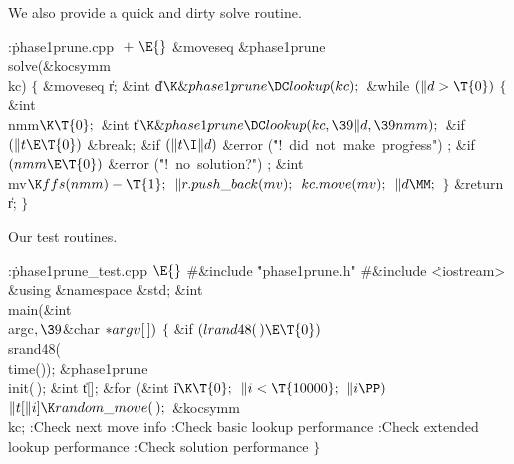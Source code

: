 We also provide a quick and dirty solve routine.

\Y\B\4:\.{phase1prune.cpp }\X${}\mathrel+\E{}$\6
\&{moveseq} \&{phase1prune}\DC\\{solve}(\&{kocsymm} \\{kc})\1\1\2\2\6
${}\{{}$\1\6
\&{moveseq} \|r;\6
\&{int} \|d${}\K\&{phase1prune}\DC\\{lookup}(\\{kc});{}$\7
\&{while} ${}(\|d>\T{0}){}$\5
${}\{{}$\1\6
\&{int} \\{nmm}${}\K\T{0};{}$\6
\&{int} \|t${}\K\&{phase1prune}\DC\\{lookup}(\\{kc},\39\|d,\39\\{nmm});{}$\7
\&{if} ${}(\|t\E\T{0}){}$\1\5
\&{break};\2\6
\&{if} ${}(\|t\I\|d){}$\1\6
\&{error} (\.{"!\ did\ not\ make\ prog}\)\.{ress"})\1\5
;\2\2\6
\&{if} ${}(\\{nmm}\E\T{0}){}$\1\6
\&{error} (\.{"!\ no\ solution?"})\1\5
;\2\2\7
\&{int} \\{mv}${}\K\\{ffs}(\\{nmm})-\T{1};{}$\7
${}\|r.\\{push\_back}(\\{mv});{}$\6
${}\\{kc}.\\{move}(\\{mv});{}$\6
${}\|d\MM;{}$\6
\4${}\}{}$\2\6
\&{return} \|r;\6
\4${}\}{}$\2\par
\fi

Our test routines.

\Y\B\4:\.{phase1prune\_test.cpp }\X${}\E{}$\6
\8\#\&{include} \.{"phase1prune.h"}\6
\8\#\&{include} \.{<iostream>}\6
\&{using} \&{namespace} \&{std};\7
\&{int} \\{main}(\&{int} \\{argc}${},\39{}$\&{char} ${}{*}\\{argv}[\,]){}$\1\1%
\2\2\6
${}\{{}$\1\6
\&{if} ${}(\\{lrand48}(\,)\E\T{0}){}$\1\5
\\{srand48}(\\{time}());\2\6
\&{phase1prune}\DC\\{init}(\,);\7
\&{int} \|t[];\7
\&{for} (\&{int} \|i${}\K\T{0};{}$ ${}\|i<\T{10000};{}$ ${}\|i\PP){}$\1\5
${}\|t[\|i]\K\\{random\_move}(\,);{}$\2\7
\&{kocsymm} \\{kc};\7
:Check next move info\X\6
:Check basic lookup performance\X\6
:Check extended lookup performance\X\6
:Check solution performance\X\6
\4${}\}{}$\2\par
\fi

